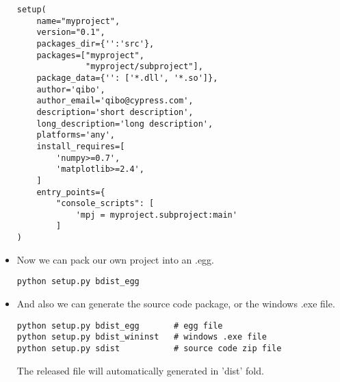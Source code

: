 \begin{itemize}
\begin{lstlisting}
setup(
    name="myproject",
    version="0.1",
    packages_dir={'':'src'},
    packages=["myproject",
              "myproject/subproject"],
    package_data={'': ['*.dll', '*.so']},
    author='qibo',
    author_email='qibo@cypress.com',
    description='short description',
    long_description='long description',
    platforms='any',
    install_requires=[
        'numpy>=0.7',
        'matplotlib>=2.4',
    ]
    entry_points={
        "console_scripts": [
            'mpj = myproject.subproject:main'
        ]
)
\end{lstlisting}
\item
Now we can pack our own project into an .egg.
\begin{lstlisting}
python setup.py bdist_egg
\end{lstlisting}
\item
And also we can generate the source code package, or the windows .exe file.
\begin{lstlisting}
python setup.py bdist_egg       # egg file
python setup.py bdist_wininst   # windows .exe file
python setup.py sdist           # source code zip file
\end{lstlisting}
The released file will automatically generated in 'dist' fold.
\end{itemize}

\newpage
